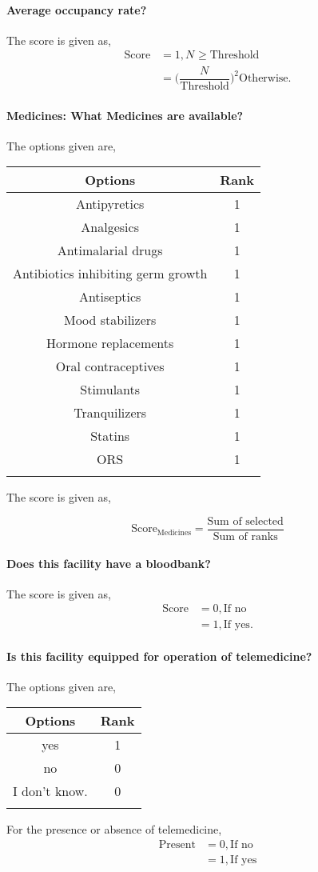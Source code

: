 \documentclass[oneside]{article}
\newcommand{\tsub}[2]{\text{#1}_{\text{#2}}}
\newcommand{\tsubb}[2]{#1_{\text{#2}}}
\newcommand{\dsub}[2]{\dfrac{\text{#1}}{\text{#2}}}
\newcommand{\multsel}[1]
{
	\[
		\tsub{Score}{#1} = \dsub{Sum of selected}{Sum of ranks}
	\]
}
\newenvironment{ttable}
{
\begin{center}
\begin{tabular}{c|c}
\hline
}
{
\\ \hline
\end{tabular}
\end{center}
}
\begin{document}
\paragraph{ Average occupancy rate?}

The score is given as,
\begin{align*}
\tsub{Score}{} &= 1, \tsubb{N}{} \ge \text{Threshold} \\
        &=
\Big(\dfrac{\tsubb{N}{}}{\text{Threshold}}\Big)^{2}
\text{Otherwise}.
\end{align*}
\paragraph{Medicines: What Medicines are available?}

The options given are,
\begin{ttable}
Options & Rank \\ \hline
Antipyretics & 1 \\
Analgesics & 1 \\
Antimalarial drugs & 1 \\
Antibiotics inhibiting germ growth & 1 \\
Antiseptics & 1 \\
Mood stabilizers & 1 \\
Hormone replacements & 1 \\
Oral contraceptives & 1 \\
Stimulants & 1 \\
Tranquilizers & 1 \\
Statins & 1 \\
ORS & 1 \\
\hline
\end{ttable}
The score is given as,
\multsel{Medicines}
\paragraph{ Does this facility have a bloodbank?}

The score is given as,
\begin{align*}
\tsub{Score}{} &= 0, \text{If no} \\
        &= 1, \text{If yes}.
\end{align*}
\paragraph{ Is this facility equipped for operation of telemedicine?}

The options given are,
\begin{ttable}
Options & Rank \\ \hline
yes & 1 \\
no & 0 \\
I don't know. & 0 \\
\hline
\end{ttable}
For the presence or absence of telemedicine,
\begin{align*}
	\text{Present} &= 0, \text{If no} \\
	&= 1, \text{If yes}
\end{align*}
\end{document}
